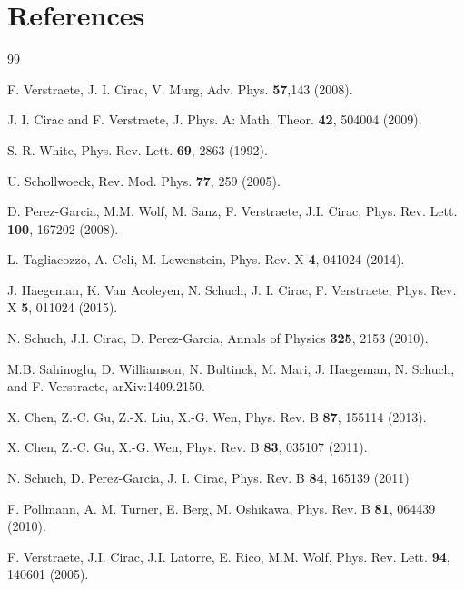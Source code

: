 \documentclass{elsarticle}
\begin{document}
\section*{References}

\begin{thebibliography}{99}

    F. Verstraete, J. I. Cirac, V. Murg,
    Adv. Phys. {\bf 57},143 (2008).


    J. I. Cirac and F. Verstraete, J. Phys. A: Math. Theor. {\bf 42}, 504004 (2009).

    S. R. White,
    Phys. Rev. Lett. {\bf 69}, 2863 (1992).

    U. Schollwoeck,
    Rev. Mod. Phys. {\bf 77}, 259 (2005).

    D. Perez-Garcia, M.M. Wolf, M. Sanz, F. Verstraete,  J.I. Cirac,
    Phys. Rev. Lett. {\bf 100}, 167202 (2008).


    L. Tagliacozzo, A. Celi,  M. Lewenstein,
    Phys. Rev. X {\bf 4}, 041024 (2014).

    J. Haegeman, K. Van Acoleyen, N. Schuch, J. I. Cirac,  F. Verstraete,
    Phys. Rev. X {\bf 5}, 011024 (2015).


    N. Schuch, J.I. Cirac,  D. Perez-Garcia,
    Annals of Physics {\bf 325}, 2153 (2010).

    M.B. Sahinoglu, D. Williamson, N. Bultinck, M. Mari\xEBn, J. Haegeman,
    N. Schuch, and F. Verstraete,
    arXiv:1409.2150.

    X. Chen, Z.-C. Gu, Z.-X. Liu,  X.-G. Wen,
    Phys. Rev. B {\bf 87}, 155114 (2013).

    X. Chen, Z.-C. Gu, X.-G. Wen,
    Phys. Rev. B {\bf 83}, 035107 (2011).

    N. Schuch, D. Perez-Garcia,  J. I. Cirac,
    Phys. Rev. B {\bf 84}, 165139 (2011)

    F. Pollmann, A. M. Turner, E. Berg,  M. Oshikawa,
    Phys. Rev. B {\bf 81}, 064439 (2010).

    F. Verstraete, J.I. Cirac, J.I. Latorre, E. Rico,  M.M. Wolf,
    Phys. Rev. Lett. {\bf 94}, 140601 (2005).


\end{thebibliography}
\end{document}
